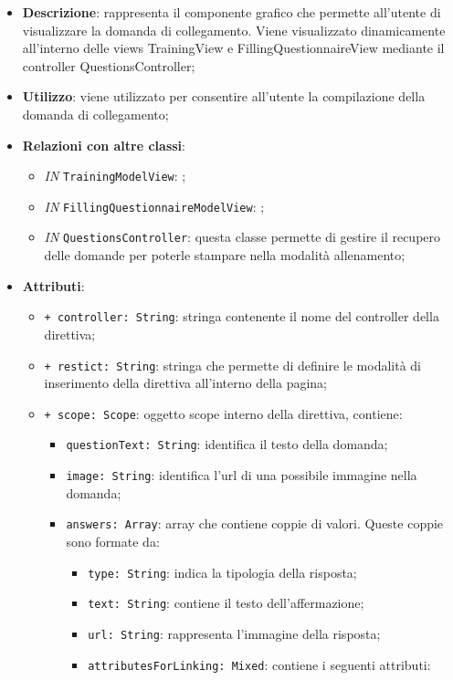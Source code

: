 		\begin{itemize}
			\item \textbf{Descrizione}: rappresenta il componente grafico che permette all'utente di visualizzare la domanda di collegamento. Viene visualizzato dinamicamente all'interno delle views TrainingView e FillingQuestionnaireView mediante il controller QuestionsController;
			\item \textbf{Utilizzo}: viene utilizzato per consentire all'utente la compilazione della domanda di collegamento;
			\item \textbf{Relazioni con altre classi}: 
			\begin{itemize}
				\item \textit{IN} \texttt{TrainingModelView}: ; 
				\item \textit{IN} \texttt{FillingQuestionnaireModelView}: ;
				\item \textit{IN} \texttt{QuestionsController}: questa classe permette di gestire il recupero delle domande per poterle stampare nella modalità allenamento;
			\end{itemize}
			\item \textbf{Attributi}: 
			\begin{itemize}
				\item \texttt{+ controller: String}: stringa contenente il nome del controller della direttiva;
				\item \texttt{+ restict: String}: stringa che permette di definire le modalità di inserimento della direttiva all'interno della pagina;
				\item \texttt{+ scope: Scope}: oggetto scope interno della direttiva, contiene:
				\begin{itemize}
					\item \texttt{questionText: String}: identifica il testo della domanda;
					\item \texttt{image: String}: identifica l'url di una possibile immagine nella domanda;
					\item \texttt{answers: Array}: array che contiene coppie di valori. Queste coppie sono formate da:
					\begin{itemize}
						\item \texttt{type: String}: indica la tipologia della risposta;
						\item \texttt{text: String}: contiene il testo dell'affermazione;
						\item \texttt{url: String}: rappresenta l'immagine della risposta;
						\item \texttt{attributesForLinking: Mixed}: contiene i seguenti attributi:

\end{itemize}
\end{itemize}
\end{itemize}
\end{itemize}
